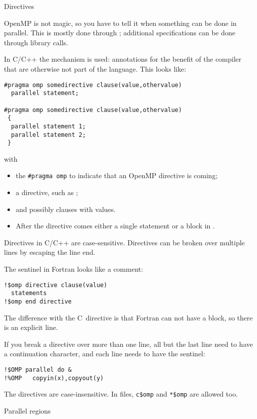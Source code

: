  {Directives}
\label{sec:omp-directives}

OpenMP is not magic, so you have to tell it when something
can be done in parallel. This is mostly done through ;
additional specifications can be done through library calls.

In C/C++ the  mechanism is used: annotations for
the benefit of the compiler that are otherwise not part of the
language. This looks like:
\begin{lstlisting}
#pragma omp somedirective clause(value,othervalue)
  parallel statement;

#pragma omp somedirective clause(value,othervalue)
 {
  parallel statement 1;
  parallel statement 2;
 }
\end{lstlisting}
with
\begin{itemize}
\item the \verb+#pragma omp+  to indicate that
  an OpenMP directive is coming;
\item a directive, such as ;
\item and possibly clauses with values.
\item After the directive comes either a single statement or a block
  in .
\end{itemize}
Directives in C/C++ are case-sensitive. Directives can be broken over
multiple lines by escaping the line end.

The sentinel in Fortran looks like a comment:
\begin{lstlisting}
!$omp directive clause(value)
  statements
!$omp end directive
\end{lstlisting}
The difference with the C~directive is that
Fortran can not have a block, so there is an explicit
 line.

If you break a directive over more than one line, all but the last line
need to have a continuation character, and each line needs to have the sentinel:
\begin{lstlisting}
!$OMP parallel do &
!%OMP   copyin(x),copyout(y)
\end{lstlisting}
The directives are case-insensitive. In
 files, \verb+c$omp+ and
\verb+*$omp+ are allowed too.


 {Parallel regions}

